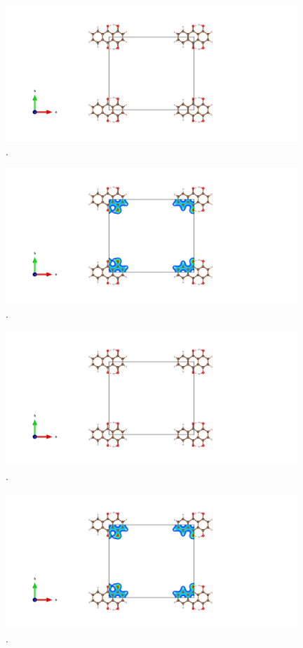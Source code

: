 \documentclass{article}
\begin{document}
  \begin{figure}[H]
      \centering
      \includegraphics[width = 11cm]{../fig/basic_relax_CONTCAR.png}
      \caption{. }
      \label{fig:basic_relax_CONTCAR}
  \end{figure}

  \begin{figure}[H]
      \centering
      \includegraphics[width = 11cm]{../fig/basic_relax_CHGCAR.png}
      \caption{. }
      \label{fig:basic_relax_CHGCAR}
  \end{figure}

  \begin{figure}[H]
      \centering
      \includegraphics[width = 11cm]{../fig/basic_staticafter_CONTCAR.png}
      \caption{. }
      \label{fig:basic_staticafter_CONTCAR}
  \end{figure}

  \begin{figure}[H]
      \centering
      \includegraphics[width = 11cm]{../fig/basic_staticafter_CHGCAR.png}
      \caption{. }
      \label{fig:basic_staticafter_CHGCAR}
  \end{figure}
\end{document}
